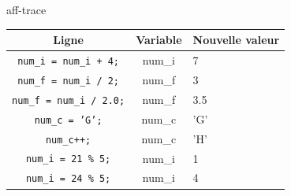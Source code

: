 \begin{UPSTIcorrectionP}{aff-trace}
    \begin{center}
    \begin{tabular}{|c|c|p{4cm}|}
        \hline
        \textbf{Ligne} & \textbf{Variable} & \textbf{Nouvelle valeur} \\
        \hline
        \texttt{num\_i = num\_i + 4;} & num\_i & 7 \\[0.3cm]
        \hline
        \texttt{num\_f = num\_i / 2;} & num\_f & 3 \\[0.3cm]
        \hline
        \texttt{num\_f = num\_i / 2.0;} & num\_f & 3.5 \\[0.3cm]
        \hline
        \texttt{num\_c = 'G';} & num\_c & 'G' \\[0.3cm]
        \hline
        \texttt{num\_c++;} & num\_c & 'H' \\[0.3cm]
        \hline
        \texttt{num\_i = 21 \% 5;} & num\_i & 1 \\[0.3cm]
        \hline
        \texttt{num\_i = 24 \% 5;} & num\_i & 4 \\[0.3cm]
        \hline
    \end{tabular}
    \end{center}
\end{UPSTIcorrectionP}
